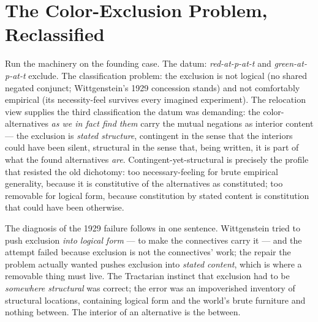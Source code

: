 \documentclass[11pt]{article}
\begin{document}
\section{The Color-Exclusion Problem, Reclassified}\label{sec:color}
Run the machinery on the founding case. The datum: \emph{red-at-p-at-t} and \emph{green-at-p-at-t} exclude. The classification problem: the exclusion is not logical (no shared negated conjunct; Wittgenstein's 1929 concession stands) and not comfortably empirical (its necessity-feel survives every imagined experiment). The relocation view supplies the third classification the datum was demanding: the color-alternatives \emph{as we in fact find them} carry the mutual negations as interior content --- the exclusion is \emph{stated structure}, contingent in the sense that the interiors could have been silent, structural in the sense that, being written, it is part of what the found alternatives \emph{are}. Contingent-yet-structural is precisely the profile that resisted the old dichotomy: too necessary-feeling for brute empirical generality, because it is constitutive of the alternatives as constituted; too removable for logical form, because constitution by stated content is constitution that could have been otherwise.

The diagnosis of the 1929 failure follows in one sentence. Wittgenstein tried to push exclusion \emph{into logical form} --- to make the connectives carry it --- and the attempt failed because exclusion is not the connectives' work; the repair the problem actually wanted pushes exclusion into \emph{stated content}, which is where a removable thing must live. The Tractarian instinct that exclusion had to be \emph{somewhere structural} was correct; the error was an impoverished inventory of structural locations, containing logical form and the world's brute furniture and nothing between. The interior of an alternative is the between.
\end{document}
